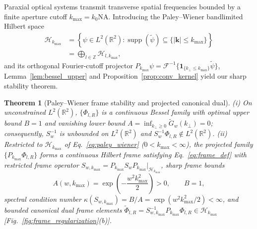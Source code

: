 \documentclass[aps,pra,reprint,nofootinbib,floatfix,longbibliography]{revtex4-2}
\newtheorem{theorem}{Theorem}
\theoremstyle{remark}
\newcommand{\abs}[1]{\lvert #1 \rvert}
\begin{document}
Paraxial optical systems transmit transverse spatial frequencies bounded by a finite aperture cutoff $k_{\max} = k_0 \mathrm{NA}$. Introducing the Paley--Wiener bandlimited Hilbert space
\begin{align}
\mathcal{H}_{k_{\max}} &= \left\{\psi \in L^2(\mathbb{R}^2) : \operatorname{supp}(\widetilde{\psi}) \subseteq \{\abs{\mathbf{k}} \le k_{\max}\}\right\} \nonumber \\
&= \bigoplus_{l\in\mathbb{Z}} \mathcal{H}_{l,k_{\max}},
\label{eq:paley_wiener}
\end{align}
and its orthogonal Fourier-cutoff projector $P_{k_{\max}}\psi = \mathcal{F}^{-1}\{\mathbf{1}_{\{k_\perp \le k_{\max}\}}\widetilde{\psi}\}$, Lemma~\ref{lem:bessel_upper} and Proposition~\ref{prop:conv_kernel} yield our sharp stability theorem.

\begin{theorem}[Paley--Wiener frame stability and projected canonical dual]
\label{thm:pw_bounds}
(i) On unconstrained $L^2(\mathbb{R}^2)$, $\{\Phi_{l,R}\}$ is a continuous Bessel family with optimal upper bound $B = 1$ and vanishing lower bound $A = \inf_{k_\perp \ge 0}\widetilde{G}_w(k_\perp) = 0$; consequently, $S_w^{-1}$ is unbounded on $L^2(\mathbb{R}^2)$ and $S_w^{-1}\Phi_{l,R} \notin L^2(\mathbb{R}^2)$. (ii) Restricted to $\mathcal{H}_{k_{\max}}$ of Eq.~\eqref{eq:paley_wiener} ($0 < k_{\max} < \infty$), the projected family $\{P_{k_{\max}}\Phi_{l,R}\}$ forms a continuous Hilbert frame satisfying Eq.~\eqref{eq:frame_def} with restricted frame operator $S_{w,k_{\max}} = P_{k_{\max}} S_w P_{k_{\max}}\big|_{\mathcal{H}_{k_{\max}}}$, sharp frame bounds
\begin{equation}
A(w,k_{\max}) = \exp\!\left(-\frac{w^2 k_{\max}^2}{2}\right) > 0, \qquad B = 1,
\label{eq:pw_bounds}
\end{equation}
spectral condition number $\kappa(S_{w,k_{\max}}) = B/A = \exp(w^2 k_{\max}^2/2) < \infty$, and bounded canonical dual frame elements $\widetilde{\Phi}_{l,R} = S_{w,k_{\max}}^{-1}P_{k_{\max}}\Phi_{l,R} \in \mathcal{H}_{k_{\max}}$ [Fig.~\ref{fig:frame_regularization}(b)].
\end{theorem}
\end{document}
